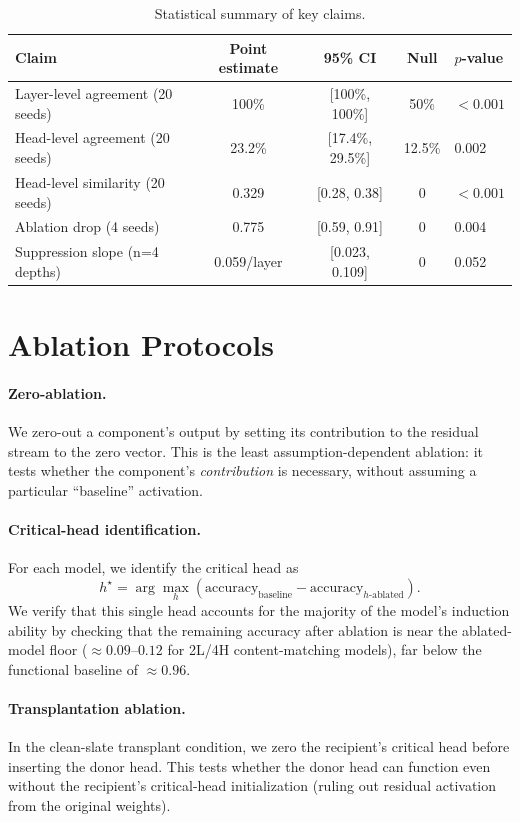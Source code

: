 \documentclass[final]{article}
\begin{document}
\begin{table}[h]
\centering
\caption{Statistical summary of key claims.}
\begin{tabular}{lcccl}
\toprule
Claim & Point estimate & 95\% CI & Null & $p$-value \\
\midrule
Layer-level agreement (20 seeds)   & 100\%     & [100\%, 100\%] & 50\%    & $<0.001$ \\
Head-level agreement (20 seeds)    & 23.2\%   & [17.4\%, 29.5\%] & 12.5\% & 0.002 \\
Head-level similarity (20 seeds)   & 0.329    & [0.28, 0.38]   & 0       & $<0.001$ \\
Ablation drop (4 seeds)            & 0.775    & [0.59, 0.91]   & 0       & 0.004 \\
Suppression slope (n=4 depths)     & 0.059/layer & [0.023, 0.109] & 0    & 0.052 \\
\bottomrule
\end{tabular}
\end{table}

\section{Ablation Protocols}
\label{app:ablation_proto}

\paragraph{Zero-ablation.}
We zero-out a component's output by setting its contribution to the residual
stream to the zero vector. This is the least assumption-dependent ablation: it
tests whether the component's \emph{contribution} is necessary, without assuming
a particular ``baseline'' activation.

\paragraph{Critical-head identification.}
For each model, we identify the critical head as
\[
h^\star = \arg\max_h \left(\text{accuracy}_\text{baseline}
  - \text{accuracy}_{h\text{-ablated}}\right).
\]
We verify that this single head accounts for the majority of the model's
induction ability by checking that the remaining accuracy after ablation is near
the ablated-model floor ($\approx 0.09\text{--}0.12$ for 2L/4H
content-matching models), far below the functional baseline of $\approx 0.96$.

\paragraph{Transplantation ablation.}
In the clean-slate transplant condition, we zero the recipient's critical head before inserting the donor head. This tests whether the donor head can function even without the recipient's critical-head initialization (ruling out residual activation from the original weights).
\end{document}
